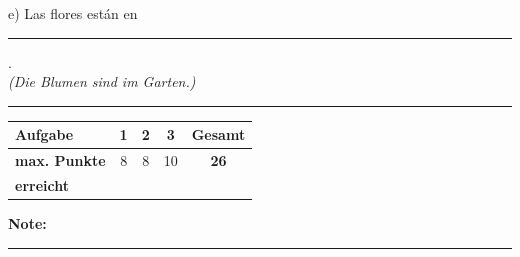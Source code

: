 \documentclass[11pt, a4paper]{article}
\newcommand{\luecke}[1]{\rule{#1}{0.4pt}}
\begin{document}
\vspace{0.8em}

\noindent
e) Las flores están en \luecke{4cm}. \\
\hspace*{0.5cm}\textit{(Die Blumen sind im Garten.)}


\vspace{25pt}
\hrule
\vspace{10pt}

\noindent
\begin{tabularx}{\textwidth}{|X|c|c|c||c|}
\hline
\textbf{Aufgabe} & 1 & 2 & 3 & \textbf{Gesamt} \\
\hline
\textbf{max. Punkte} & 8 & 8 & 10 & \textbf{26} \\
\hline
\textbf{erreicht} & & & & \\[0.8em]
\hline
\end{tabularx}

\vspace{10pt}

\begin{flushright}
\textbf{Note:} \luecke{2cm}
\end{flushright}
\end{document}
